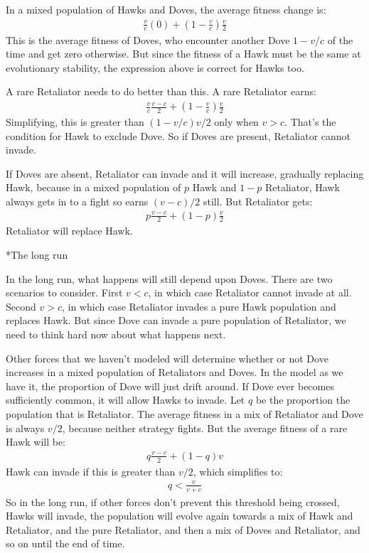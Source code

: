 \documentclass[10pt,reqno]{amsbook}
\makeatletter
\renewcommand\subsection{\@startsection{subsection}{2}
\z@{.5\linespacing\@plus.7\linespacing}{-.5em}%
{\normalfont\normalsize\bfseries}}
\numberwithin{equation}{chapter}
\makeatother
\begin{document}
In a mixed population of Hawks and Doves, the average fitness change is:
\begin{align*}
	\frac{v}{c}(0) + \left(1-\frac{v}{c}\right)\frac{v}{2}
\end{align*}
This is the average fitness of Doves, who encounter another Dove $1-v/c$ of the time and get zero otherwise. But since the fitness of a Hawk must be the same at evolutionary stability, the expression above is correct for Hawks too. 

A rare Retaliator needs to do better than this. A rare Retaliator earns:
\begin{align*}
	\frac{v}{c} \frac{v-c}{2} + \left(1-\frac{v}{c} \right) \frac{v}{2}
\end{align*}
Simplifying, this is greater than $(1-v/c)v/2$ only when $v>c$. That's the condition for Hawk to exclude Dove. So if Doves are present, Retaliator cannot invade. 

If Doves are absent, Retaliator can invade and it will increase, gradually replacing Hawk, because in a mixed population of $p$ Hawk and $1-p$ Retaliator, Hawk always gets in to a fight so earns $(v-c)/2$ still. But Retaliator gets:
\begin{align*}
	p \frac{v-c}{2} + (1-p) \frac{v}{2}
\end{align*}
Retaliator will replace Hawk.

\subsection*{The long run}

In the long run, what happens will still depend upon Doves. There are two scenarios to consider. First $v<c$, in which case Retaliator cannot invade at all. Second $v>c$, in which case Retaliator invades a pure Hawk population and replaces Hawk. But since Dove can invade a pure population of Retaliator, we need to think hard now about what happens next.

Other forces that we haven't modeled will determine whether or not Dove increases in a mixed population of Retaliators and Doves. In the model as we have it, the proportion of Dove will just drift around. 
If Dove ever becomes sufficiently common, it will allow Hawks to invade. Let $q$ be the proportion the population that is Retaliator. The average fitness in a mix of Retaliator and Dove is always $v/2$, because neither strategy fights. But the average fitness of a rare Hawk will be:
\begin{align*}
	q \frac{v-c}{2} + (1-q) v
\end{align*}
Hawk can invade if this is greater than $v/2$, which simplifies to:
\begin{align*}
	q < \frac{v}{v+c}
\end{align*}
So in the long run, if other forces don't prevent this threshold being crossed, Hawks will invade, the population will evolve again towards a mix of Hawk and Retaliator, and the pure Retaliator, and then a mix of Doves and Retaliator, and so on until the end of time.
\end{document}
